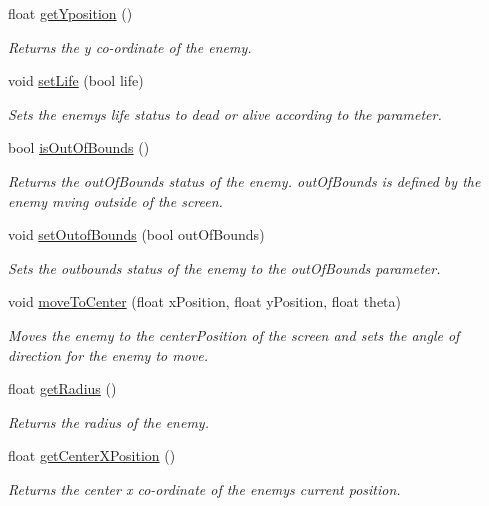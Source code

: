 \begin{DoxyCompactItemize}
float \hyperlink{class_enemy_logic_ae614032054926a4a25ed56f61111392b}{get\+Yposition} ()
\begin{DoxyCompactList}\small\item\em Returns the y co-\/ordinate of the enemy. \end{DoxyCompactList}\item 
void \hyperlink{class_enemy_logic_a12bce0a6b6cad1af96aee3b401ea2c45}{set\+Life} (bool life)
\begin{DoxyCompactList}\small\item\em Sets the enemy\textquotesingle{}s life status to dead or alive according to the parameter. \end{DoxyCompactList}\item 
bool \hyperlink{class_enemy_logic_a2e3e9e006259b36745beff4b55fd9bdc}{is\+Out\+Of\+Bounds} ()
\begin{DoxyCompactList}\small\item\em Returns the out\+Of\+Bounds status of the enemy. out\+Of\+Bounds is defined by the enemy mving outside of the screen. \end{DoxyCompactList}\item 
void \hyperlink{class_enemy_logic_a0ac79ee7c0acf99b27aa4e22f98ce2d1}{set\+Outof\+Bounds} (bool out\+Of\+Bounds)
\begin{DoxyCompactList}\small\item\em Sets the outbounds status of the enemy to the out\+Of\+Bounds parameter. \end{DoxyCompactList}\item 
void \hyperlink{class_enemy_logic_a560cc578db8a77f250b63a111f51125e}{move\+To\+Center} (float x\+Position, float y\+Position, float theta)
\begin{DoxyCompactList}\small\item\em Moves the enemy to the center\+Position of the screen and sets the angle of direction for the enemy to move. \end{DoxyCompactList}\item 
float \hyperlink{class_enemy_logic_ab6736c870e69bc20bef8d6d010946eb2}{get\+Radius} ()
\begin{DoxyCompactList}\small\item\em Returns the radius of the enemy. \end{DoxyCompactList}\item 
float \hyperlink{class_enemy_logic_a1429e91a81da7646d9b0280f26519d8c}{get\+Center\+X\+Position} ()
\begin{DoxyCompactList}\small\item\em Returns the center x co-\/ordinate of the enemy\textquotesingle{}s current position. \end{DoxyCompactList}\item 

\end{DoxyCompactItemize}
